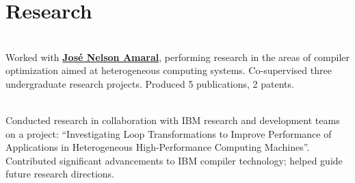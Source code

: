 \documentclass[]{twocol-resume}
\begin{document}
\begin{minipage}[t]{0.66\textwidth}
\section{Research}
\\Worked with \textbf{\href{http://webdocs.cs.ualberta.ca/~amaral/}{Jos\'e Nelson
    Amaral}}, performing research in the areas of compiler optimization aimed at
heterogeneous computing systems. Co-supervised three undergraduate research
projects. Produced 5 publications, 2 patents.
\vspace*{2pt}

\sectionseptiny
{}
\\Conducted research in collaboration with IBM research and development
teams on a project: ``Investigating Loop Transformations to Improve Performance
of Applications in Heterogeneous High-Performance Computing Machines''.
Contributed significant advancements to IBM compiler technology;
helped guide future research directions.
\sectionseptiny


\end{minipage}
\end{document}
